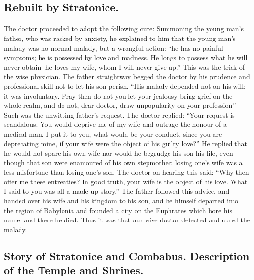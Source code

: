 \documentclass[a4paper, 11pt, oneside, polutonikogreek, english]{article}
\begin{document}
\subsection{Rebuilt by Stratonice.}
\paragraph{}
The doctor proceeded to adopt the following cure: Summoning the young man's father, who was racked by anxiety, he explained to him that the young man's malady was no normal malady, but a wrongful action: ``he has no painful symptoms; he is possessed by love and madness. He longs to possess what he will never obtain; he loves my wife, whom I will never give up.'' This was the trick of the wise physician. The father straightway begged the doctor by his prudence and professional skill not to let his son perish. ``His malady depended not on his will; it was involuntary. Pray then do not you let your jealousy bring grief on the whole realm, and do not, dear doctor, draw unpopularity on your profession.'' Such was the unwitting father's request. The doctor replied: ``Your request is scandalous. You would deprive me of my wife and outrage the honour of a medical man. I put it to you, what would be your conduct, since you are deprecating mine, if your wife were the object of his guilty love?'' He replied that he would not spare his own wife nor would he begrudge his son his life, even though that son were enamoured of his own stepmother: losing one's wife was a less misfortune than losing one's son. The doctor on hearing this said: ``Why then offer me these entreaties? In good truth, your wife is the object of his love. What I said to you was all a made-up story.'' The father followed this advice, and handed over his wife and his kingdom to his son, and he himself departed into the region of Babylonia and founded a city on the Euphrates which bore his name: and there he died. Thus it was that our wise doctor detected and cured the malady.

\subsection{Story of Stratonice and Combabus. Description of the Temple and Shrines.}
\end{document}
